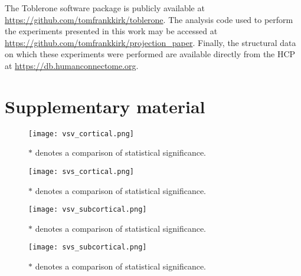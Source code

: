 \documentclass[review]{elsarticle}
\begin{document}
The Toblerone software package is publicly available at \url{https://github.com/tomfrankkirk/toblerone}. The analysis code used to perform the experiments presented in this work may be accessed at \url{https://github.com/tomfrankkirk/projection_paper}. Finally, the structural data on which these experiments were performed are available directly from the HCP at \url{https://db.humanconnectome.org}. 

\section{Supplementary material}

\begin{figure}[H]
\centering
\texttt{[image: vsv\_cortical.png]}
\caption{$*$ denotes a comparison of statistical significance.}
\label{vsv_cortical}
\end{figure}

\begin{figure}[H]
\centering
\texttt{[image: svs\_cortical.png]}
\caption{$*$ denotes a comparison of statistical significance.}
\label{svs_cortical}
\end{figure}

\begin{figure}[H]
\centering
\texttt{[image: vsv\_subcortical.png]}
\caption{$*$ denotes a comparison of statistical significance.}
\label{vsv_subcortical}
\end{figure}

\begin{figure}[H]
\centering
\texttt{[image: svs\_subcortical.png]}
\caption{$*$ denotes a comparison of statistical significance.}
\label{svs_subcortical}
\end{figure}


\end{document}
